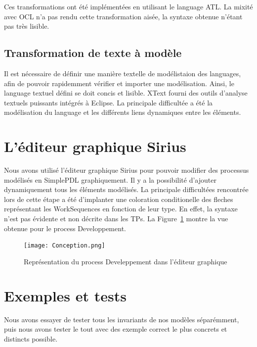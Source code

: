 \documentclass[12pt]{article}
\begin{document}
Ces transformations ont été implémentées en utilisant le language ATL. La mixité avec OCL n'a pas rendu cette transformation aisée, la syntaxe obtenue n'étant pas très lisible.

\subsection{Transformation de texte à modèle}
Il est nécessaire de définir une manière textelle de modélistaion des languages, afin de pouvoir rapidemment vérifier et importer une modélisation. Ainsi, le language textuel défini se doit concis et lisible. XText fourni des outils d'analyse textuels puissants intégrés à Eclipse. 
La principale difficultée a été la modélisation du language et les différents liens dynamiques entre les éléments.

\section{L'éditeur graphique Sirius}
Nous avons utilisé l'éditeur graphique Sirius pour pouvoir modifier des processus modélisés en SimplePDL graphiquement. Il y a la possibilité d'ajouter dynamiquement tous les éléments modélisés. 
La principale difficultées rencontrée lors de cette étape a été d'implanter une coloration conditionelle des fleches représentant les WorkSequences en fonction de leur type. En effet, la syntaxe n'est pas évidente et non décrite dans les TPs.
La Figure~\ref{fig:Conception} montre la vue obtenue pour le process Developpement.
\begin{figure}[!h]
  \centering
  \texttt{[image: Conception.png]}
  \caption{Représentation du process Develeppement dans l'éditeur graphique}\label{fig:Conception} 
\end{figure}
\newpage

\section{Exemples et tests}
Nous avons essayer de tester tous les invariants de nos modèles séparémment, puis nous avons tester le tout avec des exemple correct le plus concrets et distincts possible.
\end{document}
